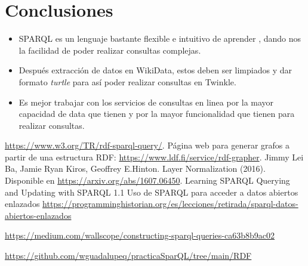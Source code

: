 \documentclass[conference]{IEEEtran}
\begin{document}
\newpage

\section{Conclusiones}

\begin{itemize}
\item  SPARQL es un lenguaje bastante flexible e intuitivo de aprender , dando nos la facilidad de poder realizar consultas complejas. 
\item Después extracción de datos en WikiData, estos deben ser limpiados y dar formato \textit{turtle} para así poder realizar consultas en Twinkle.
\item Es mejor trabajar con los servicios  de consultas en linea por la mayor capacidad de data que tienen y por la mayor funcionalidad que tienen para realizar consultas.

\end{itemize}

\begin{thebibliography}{00}
\href{https://arxiv.org/abs/1502.03167}{https://www.w3.org/TR/rdf-sparql-query/}. 
Página web para generar grafos a partir de una estructura RDF: \href{https://www.ldf.fi/service/rdf-grapher}{https://www.ldf.fi/service/rdf-grapher}.
 Jimmy Lei Ba, Jamie Ryan Kiros, Geoffrey E.Hinton. Layer Normalization (2016). Disponible en \href{https://arxiv.org/abs/1607.06450}{https://arxiv.org/abs/1607.06450}.
Learning SPARQL
Querying and Updating with SPARQL 1.1
Uso de SPARQL para acceder a datos abiertos enlazados \href{https://programminghistorian.org/es/lecciones/retirada/sparql-datos-abiertos-enlazados}{https://programminghistorian.org/es/lecciones/retirada/sparql-datos-abiertos-enlazados}

\href{https://medium.com/wallscope/constructing-sparql-queries-ca63b8b9ac02}{https://medium.com/wallscope/constructing-sparql-queries-ca63b8b9ac02}

\href{https://github.com/wguadalupeq/practicaSparQL/tree/main/RDF}{https://github.com/wguadalupeq/practicaSparQL/tree/main/RDF}

\end{thebibliography}
\end{document}
